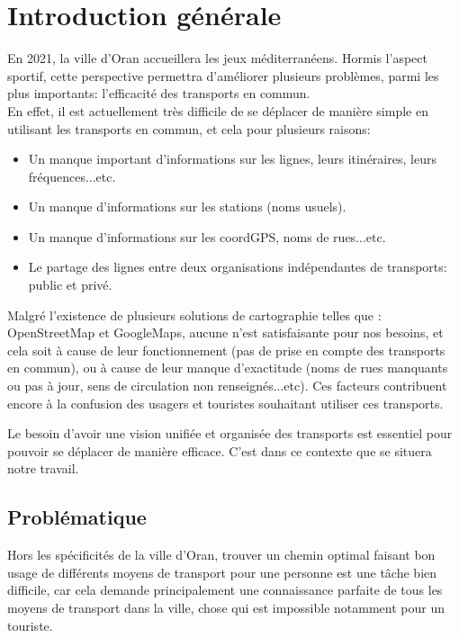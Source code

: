 \renewcommand\labelitemi{-}
\renewcommand\labelitemii{$\circ$}
\chapter{Introduction générale}

En 2021, la ville d'Oran accueillera les jeux méditerranéens. Hormis l'aspect sportif, cette perspective permettra d'améliorer plusieurs problèmes, parmi les plus importants: l'efficacité des transports en commun.\\
En effet, il est actuellement très difficile de se déplacer de manière simple en utilisant les transports en commun, et cela pour plusieurs raisons:
\begin{itemize}
	\item Un manque important d'informations sur les lignes, leurs itinéraires, leurs fréquences...etc.
	\item Un manque d'informations sur les stations (noms usuels).
	\item Un manque d'informations sur les \gls{coordGPS}, noms de rues...etc.
	\item Le partage des lignes entre deux organisations indépendantes de transports: public et privé.
\end{itemize}
Malgré l'existence de plusieurs solutions de \gls{cartographie} telles que : \gls{OpenStreetMap} et \gls{GoogleMaps}, aucune n'est satisfaisante pour nos besoins, et cela soit à cause de leur fonctionnement (pas de prise en compte des transports en commun), ou à cause de leur manque d'exactitude (noms de rues manquants ou pas à jour, sens de circulation non renseignés...etc). Ces facteurs contribuent encore à la confusion des usagers et touristes souhaitant utiliser ces transports.

Le besoin d'avoir une vision unifiée et organisée des transports est essentiel pour pouvoir se déplacer de manière efficace. C'est dans ce contexte que se situera notre travail.\\

\renewcommand\labelitemi{$\bullet$}
\section{Problématique}
Hors les spécificités de la ville d'Oran, trouver un chemin optimal faisant bon usage de différents moyens de transport pour une personne est une tâche bien difficile, car cela demande principalement une connaissance parfaite de tous les moyens de transport dans la ville, chose qui est impossible notamment pour un touriste.\newline

